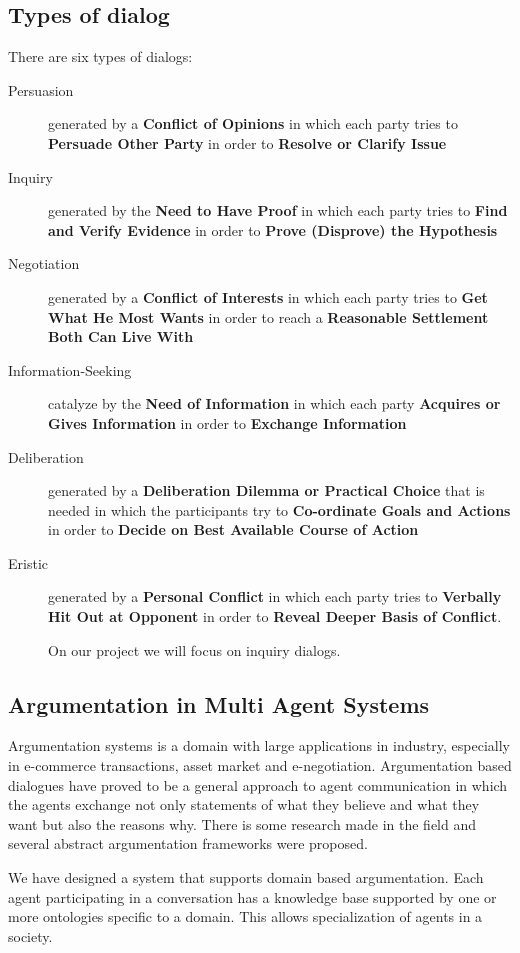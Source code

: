 \subsection{Types of dialog}
There are six types of dialogs:
\begin{description}
\item[Persuasion] generated by a \textbf{Conflict of Opinions} in which each party tries to \textbf{Persuade Other Party} in order to \textbf{Resolve or Clarify Issue}
\item[Inquiry] generated by the \textbf{Need to Have Proof} in which each party tries to \textbf{Find and Verify Evidence} in order to \textbf{Prove (Disprove) the Hypothesis}
\item[Negotiation] generated by a \textbf{Conflict of Interests} in which each party tries to \textbf{Get What He Most Wants} in order to reach a \textbf{Reasonable Settlement Both Can Live With}
\item[Information-Seeking] catalyze by the \textbf{Need of Information} in which each party \textbf{Acquires or Gives Information} in order to \textbf{Exchange Information}
\item[Deliberation] generated by a \textbf{Deliberation Dilemma or Practical Choice} that is needed in which the participants try to \textbf{Co-ordinate Goals and Actions} in order to \textbf{Decide on Best Available Course of Action}
\item[Eristic] generated by a \textbf{Personal Conflict} in which each party tries to \textbf{Verbally Hit Out at Opponent} in order to \textbf{Reveal Deeper Basis of Conflict}.
\par
On our project we will focus on inquiry dialogs.
\end{description}
\subsection{Argumentation in Multi Agent Systems}
\par
Argumentation systems is a domain with large applications in industry, especially in e-commerce transactions, asset market and e-negotiation. Argumentation based dialogues have proved to be a general approach to agent communication in which the agents exchange not only statements of what they believe and what they want but also the reasons why. There is some research made in the field and several abstract argumentation frameworks were proposed\cite{amgoud}\cite{parsons}.
\par
We have designed a system that supports domain based argumentation. Each agent participating in a conversation has a knowledge base supported by one or more ontologies specific to a domain. This allows specialization of agents in a society.
